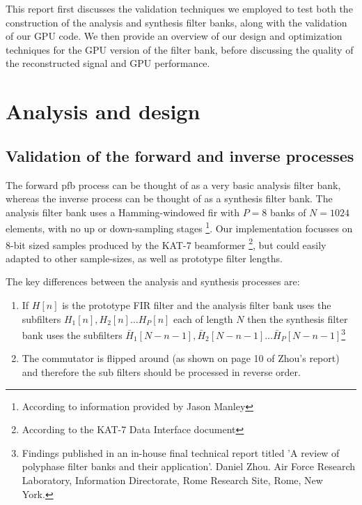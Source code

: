 \documentclass[a4paper,10pt]{article}
\begin{document}
This report first discusses the validation techniques we employed to test both the construction of the analysis and synthesis filter banks, along with the validation of our GPU 
code. We then provide an overview of our design and optimization techniques for the GPU version of the filter bank, before discussing the quality of the reconstructed signal and
GPU performance.
\section{Analysis and design}
\subsection{Validation of the forward and inverse processes}
The forward \gls{pfb} process can be thought of as a very basic analysis filter bank, whereas the inverse process can be thought of as a synthesis filter bank. The 
analysis filter bank uses a Hamming-windowed \gls{fir} with $P=8$ banks of $N=1024$ elements, with no up or down-sampling stages \footnote{According to information provided by Jason Manley}.
Our implementation focusses on 8-bit sized samples produced by the KAT-7 beamformer \footnote{According to the KAT-7 Data Interface document}, but could easily adapted to other sample-sizes,
as well as prototype filter lengths.

The key differences between the analysis and synthesis processes are:
\begin{enumerate}
 \item If $H[n]$ is the prototype FIR filter and the analysis filter bank uses the subfilters $H_1[n], H_2[n] \dots H_P[n]$ each of length $N$ then the synthesis filter bank
 uses the subfilters $\bar H_1[N-n-1], \bar H_2[N-n-1] \dots \bar H_P[N-n-1]$\footnote{Findings published in an in-house final technical report titled 'A review of polyphase filter 
 banks and their application'. Daniel Zhou. Air Force Research Laboratory, Information Directorate, Rome Research Site, Rome, New York.}
 \item The commutator is flipped around (as shown on page 10 of Zhou's report) and therefore the sub filters should be processed in reverse order.
\end{enumerate}
\end{document}
